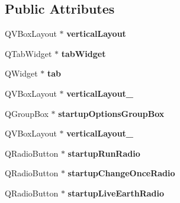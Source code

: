 \subsection*{Public Attributes}
\begin{DoxyCompactItemize}
\item 
\hypertarget{classUi__Preferences_a722426c9c3f286e8490cb46d018dde0f}{
QVBoxLayout $\ast$ {\bfseries verticalLayout}}
\label{classUi__Preferences_a722426c9c3f286e8490cb46d018dde0f}

\item 
\hypertarget{classUi__Preferences_a4f58302cca06f93e8714c6bd88b48aa6}{
QTabWidget $\ast$ {\bfseries tabWidget}}
\label{classUi__Preferences_a4f58302cca06f93e8714c6bd88b48aa6}

\item 
\hypertarget{classUi__Preferences_a1fe1c0c2e19204ecd2d8a61d5ae24d0c}{
QWidget $\ast$ {\bfseries tab}}
\label{classUi__Preferences_a1fe1c0c2e19204ecd2d8a61d5ae24d0c}

\item 
\hypertarget{classUi__Preferences_ae3127ba315cedc5477a5de16a64ac2a3}{
QVBoxLayout $\ast$ {\bfseries verticalLayout\_}}
\label{classUi__Preferences_ae3127ba315cedc5477a5de16a64ac2a3}

\item 
\hypertarget{classUi__Preferences_a6b9f14014b45e259f04af95ab2f0bab2}{
QGroupBox $\ast$ {\bfseries startupOptionsGroupBox}}
\label{classUi__Preferences_a6b9f14014b45e259f04af95ab2f0bab2}

\item 
\hypertarget{classUi__Preferences_a8d2ebaea31177b90094be7df939bd59b}{
QVBoxLayout $\ast$ {\bfseries verticalLayout\_}}
\label{classUi__Preferences_a8d2ebaea31177b90094be7df939bd59b}

\item 
\hypertarget{classUi__Preferences_a1eb4559ebb63551ec3ebd03e1209a0c1}{
QRadioButton $\ast$ {\bfseries startupRunRadio}}
\label{classUi__Preferences_a1eb4559ebb63551ec3ebd03e1209a0c1}

\item 
\hypertarget{classUi__Preferences_a394530273401e5624c80f0b0665a8242}{
QRadioButton $\ast$ {\bfseries startupChangeOnceRadio}}
\label{classUi__Preferences_a394530273401e5624c80f0b0665a8242}

\item 
\hypertarget{classUi__Preferences_ad4180835bda75254d45f8f6a8bde10a6}{
QRadioButton $\ast$ {\bfseries startupLiveEarthRadio}}
\label{classUi__Preferences_ad4180835bda75254d45f8f6a8bde10a6}


\end{DoxyCompactItemize}
